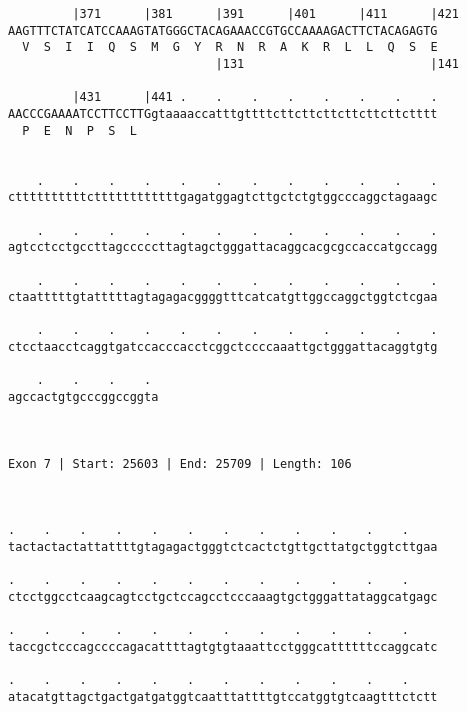 \documentclass{article}
\begin{document}
\begin{Verbatim}
         |371      |381      |391      |401      |411      |421
AAGTTTCTATCATCCAAAGTATGGGCTACAGAAACCGTGCCAAAAGACTTCTACAGAGTG
  V  S  I  I  Q  S  M  G  Y  R  N  R  A  K  R  L  L  Q  S  E
                             |131                          |141
  
         |431      |441 .    .    .    .    .    .    .    .
AACCCGAAAATCCTTCCTTGgtaaaaccatttgttttcttcttcttcttcttcttctttt
  P  E  N  P  S  L                                          
                                                            
  
    .    .    .    .    .    .    .    .    .    .    .    .
cttttttttttcttttttttttttgagatggagtcttgctctgtggcccaggctagaagc
                                                            
    .    .    .    .    .    .    .    .    .    .    .    .
agtcctcctgccttagcccccttagtagctgggattacaggcacgcgccaccatgccagg
                                                            
    .    .    .    .    .    .    .    .    .    .    .    .
ctaatttttgtatttttagtagagacggggtttcatcatgttggccaggctggtctcgaa
                                                            
    .    .    .    .    .    .    .    .    .    .    .    .
ctcctaacctcaggtgatccacccacctcggctccccaaattgctgggattacaggtgtg
                                                            
    .    .    .    . 
agccactgtgcccggccggta
                     
                     
 
Exon 7 | Start: 25603 | End: 25709 | Length: 106



.    .    .    .    .    .    .    .    .    .    .    .    
tactactactattattttgtagagactgggtctcactctgttgcttatgctggtcttgaa
                                                            
.    .    .    .    .    .    .    .    .    .    .    .    
ctcctggcctcaagcagtcctgctccagcctcccaaagtgctgggattataggcatgagc
                                                            
.    .    .    .    .    .    .    .    .    .    .    .    
taccgctcccagccccagacattttagtgtgtaaattcctgggcattttttccaggcatc
                                                            
.    .    .    .    .    .    .    .    .    .    .    .    
atacatgttagctgactgatgatggtcaatttattttgtccatggtgtcaagtttctctt
                                                            

\end{Verbatim}
\end{document}
